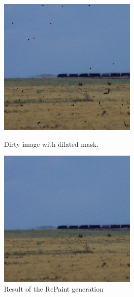 \documentclass[openany, 12pt]{article}
\begin{document}
\begin{figure}[htbp]
	\centering
	\begin{minipage}{0.45\textwidth}
		\centering
		\includegraphics[width=\textwidth]{images/masked_2.png}
		\caption{\smaller Dirty image with dilated mask.}
	\end{minipage}
	\hspace{0.05\textwidth}
	\begin{minipage}{0.45\textwidth}
		\centering
		\includegraphics[width=\textwidth]{images/inpainted_2.png}
		\caption{Result of the RePaint generation}
	\end{minipage}
\end{figure}
\end{document}
